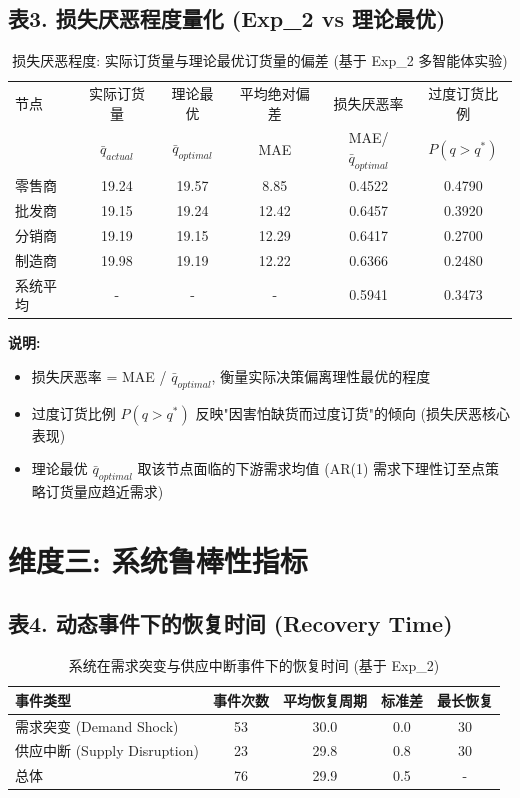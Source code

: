 \documentclass[11pt]{article}
\begin{document}
\subsection*{表3. 损失厌恶程度量化 (Exp\_2 vs 理论最优)}

\begin{table}[h]
\centering
\caption{损失厌恶程度: 实际订货量与理论最优订货量的偏差 (基于 Exp\_2 多智能体实验)}
\label{tab:loss_aversion}
\begin{tabular}{lccccc}
\toprule
节点 & 实际订货量 & 理论最优 & 平均绝对偏差 & 损失厌恶率 & 过度订货比例 \\
& $\bar{q}_{actual}$ & $\bar{q}_{optimal}$ & MAE & MAE/$\bar{q}_{optimal}$ & $P(q>q^*)$ \\
\midrule
零售商 & 19.24 & 19.57 & 8.85 & 0.4522 & 0.4790 \\
批发商 & 19.15 & 19.24 & 12.42 & 0.6457 & 0.3920 \\
分销商 & 19.19 & 19.15 & 12.29 & 0.6417 & 0.2700 \\
制造商 & 19.98 & 19.19 & 12.22 & 0.6366 & 0.2480 \\
\midrule
系统平均 & - & - & - & 0.5941 & 0.3473 \\
\bottomrule
\end{tabular}
\end{table}

\textbf{说明:}
\begin{itemize}
    \item 损失厌恶率 = MAE / $\bar{q}_{optimal}$, 衡量实际决策偏离理性最优的程度
    \item 过度订货比例 $P(q > q^*)$ 反映"因害怕缺货而过度订货"的倾向 (损失厌恶核心表现)
    \item 理论最优 $\bar{q}_{optimal}$ 取该节点面临的下游需求均值 (AR(1) 需求下理性订至点策略订货量应趋近需求)
\end{itemize}

\section*{维度三: 系统鲁棒性指标}

\subsection*{表4. 动态事件下的恢复时间 (Recovery Time)}

\begin{table}[h]
\centering
\caption{系统在需求突变与供应中断事件下的恢复时间 (基于 Exp\_2)}
\label{tab:recovery}
\begin{tabular}{lcccc}
\toprule
事件类型 & 事件次数 & 平均恢复周期 & 标准差 & 最长恢复 \\
\midrule
需求突变 (Demand Shock) & 53 & 30.0 & 0.0 & 30 \\
供应中断 (Supply Disruption) & 23 & 29.8 & 0.8 & 30 \\
\midrule
总体 & 76 & 29.9 & 0.5 & - \\
\bottomrule
\end{tabular}
\end{table}
\end{document}
